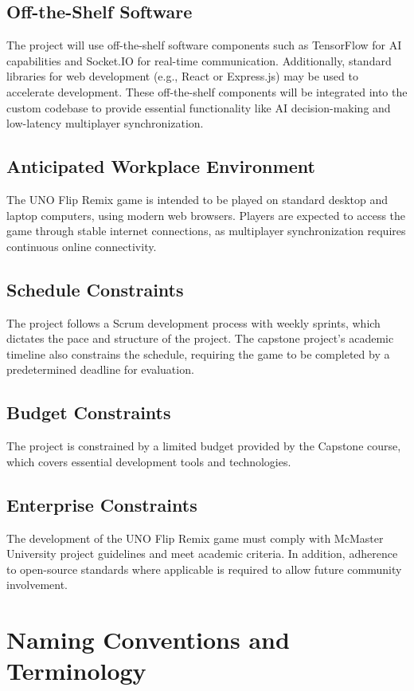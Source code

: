 \documentclass{article}
\begin{document}
\subsection{Off-the-Shelf Software}
The project will use off-the-shelf software components such as TensorFlow for AI capabilities and Socket.IO for real-time communication. Additionally, standard libraries for web development (e.g., React or Express.js) may be used to accelerate development. These off-the-shelf components will be integrated into the custom codebase to provide essential functionality like AI decision-making and low-latency multiplayer synchronization.

\subsection{Anticipated Workplace Environment}
The UNO Flip Remix game is intended to be played on standard desktop and laptop computers, using modern web browsers. Players are expected to access the game through stable internet connections, as multiplayer synchronization requires continuous online connectivity.

\subsection{Schedule Constraints}
The project follows a Scrum development process with weekly sprints, which dictates the pace and structure of the project. The capstone project's academic timeline also constrains the schedule, requiring the game to be completed by a predetermined deadline for evaluation.

\subsection{Budget Constraints}
The project is constrained by a limited budget provided by the Capstone course, which covers essential development tools and technologies.

\subsection{Enterprise Constraints}
The development of the UNO Flip Remix game must comply with McMaster University project guidelines and meet academic criteria. In addition, adherence to open-source standards where applicable is required to allow future community involvement.

\section{Naming Conventions and Terminology}
\end{document}
